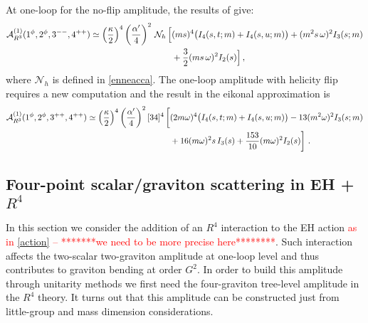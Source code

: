 \documentclass[a4paper,11pt]{article}
\numberwithin{equation}{section}
\newcommand{\sqr}[2]{\lbrack #1 #2 \rbrack}
\newcommand{\cN}{\mathcal{N}}
\begin{document}
At one-loop for the no-flip amplitude, the results of \cite{Brandhuber:2019qpg} give: 
\begin{equation}
    \begin{split}
    \label{gravitonbending}
        \mathcal{A}^{(1)}_{R^3}  (1^\phi, 2^\phi, 3^{--}, 4^{++}) \simeq \left({\kappa\over 2}\right)^4 \left({\alpha^\prime\over 4}\right)^2 \, \cN_h \, \Big[& (m s)^4 \big(I_4 (s, t;m) + I_4 (s, u;m) \big)  + (m^2 s\, \omega )^2  I_3 (s;m) \\ & + \frac{3}{2} (m s\, \omega )^2    I_2 (s) \Big]  \, , 
    \end{split}
\end{equation}
where $\cN_h$ is defined in \eqref{enneacca}. The one-loop amplitude with helicity flip requires a new computation and the result in the eikonal approximation is
\begin{equation}
    \begin{split}
        \mathcal{A}^{(1)}_{R^3}  (1^\phi, 2^\phi, 3^{++}, 4^{++}) \simeq \left({\kappa\over 2}\right)^4 \left({\alpha^\prime\over 4}\right)^2 \sqr{3}{4}^4 \,  \bigg[ & (2 m \omega )^4  \big(I_4 (s, t;m) + I_4 (s, u;m) \big) -13 ( m^2 \omega)^2  I_3 (s;m) \\
        & +16 (m \omega)^2 s \, I_3(s) + \dfrac{153}{10} (m \omega)^2 I_2 (s) \bigg]
        \ .
    \end{split}
\end{equation}

\subsection{Four-point scalar/graviton scattering in EH + \texorpdfstring{$R^4$}{R4}}
In this section we consider the addition of an $R^4$ interaction to the  EH action  \textcolor{red}{as in \eqref{action} -- *******we need to be more precise here********}.
Such interaction affects the two-scalar two-graviton amplitude at one-loop level and thus contributes to graviton bending at order $G^2$. In order to build this amplitude through unitarity methods we first need the four-graviton tree-level amplitude in the $R^4$ theory. It turns out that this amplitude can be constructed just from little-group and mass dimension considerations.
\end{document}
